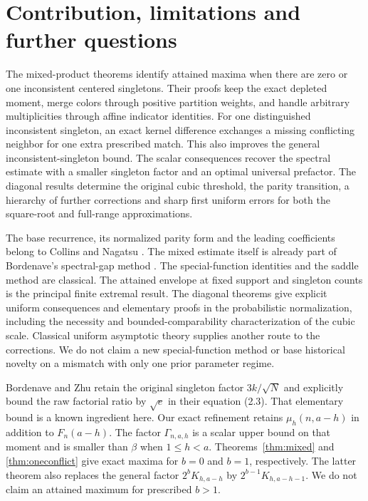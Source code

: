 \section{Contribution, limitations and further questions}

The mixed-product theorems identify attained maxima when there are zero or one inconsistent centered singletons. Their proofs keep the exact depleted moment, merge colors through positive partition weights, and handle arbitrary multiplicities through affine indicator identities. For one distinguished inconsistent singleton, an exact kernel difference exchanges a missing conflicting neighbor for one extra prescribed match. This also improves the general inconsistent-singleton bound. The scalar consequences recover the spectral estimate with a smaller singleton factor and an optimal universal prefactor. The diagonal results determine the original cubic threshold, the parity transition, a hierarchy of further corrections and sharp first uniform errors for both the square-root and full-range approximations.

The base recurrence, its normalized parity form and the leading coefficients belong to Collins and Nagatsu \cite{CN}. The mixed estimate itself is already part of Bordenave's spectral-gap method \cite{Bordenave}. The special-function identities and the saddle method are classical. The attained envelope at fixed support and singleton counts is the principal finite extremal result. The diagonal theorems give explicit uniform consequences and elementary proofs in the probabilistic normalization, including the necessity and bounded-comparability characterization of the cubic scale. Classical uniform asymptotic theory supplies another route to the corrections. We do not claim a new special-function method or base historical novelty on a mismatch with only one prior parameter regime.

Bordenave and Zhu \cite[Lemma 2.1]{BZ} retain the original singleton factor $3k/\sqrt N$ and explicitly bound the raw factorial ratio by $\sqrt e$ in their equation (2.3). That elementary bound is a known ingredient here. Our exact refinement retains $\mu_h(n,a-h)$ in addition to $F_n(a-h)$. The factor $\Gamma_{n,a,h}$ is a scalar upper bound on that moment and is smaller than $\beta$ when $1\le h<a$. Theorems~\ref{thm:mixed} and \ref{thm:oneconflict} give exact maxima for $b=0$ and $b=1$, respectively. The latter theorem also replaces the general factor $2^bK_{h,a-h}$ by $2^{b-1}K_{h,a-h-1}$. We do not claim an attained maximum for prescribed $b>1$.

